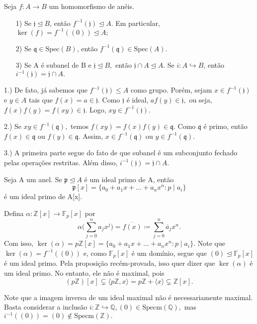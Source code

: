 \documentclass[AlgebraII/algebraII_notes.tex]{subfiles}
\begin{document}
\begin{prop*}
	Seja \(f:A\rightarrow B\) um homomorfismo de anéis.
	\begin{itemize}
		\item[1)] Se \(\mathfrak{j}\trianglelefteq{B}\), então \(f^{-1}(\mathfrak{j})\trianglelefteq{A}.\) Em particular, \(\ker{(f)} = f^{-1}((0))\trianglelefteq{A};\)
		\item[2)] Se \(\mathfrak{q}\in \mathrm{Spec}(B)\), então \(f^{-1}(\mathfrak{q})\in \mathrm{Spec}(A).\)
		\item[3)] Se A é subanel de B e \(\mathfrak{j}\trianglelefteq{B},\) então \(\mathfrak{j}\cap A \trianglelefteq{A}.\) Se \(i:A\hookrightarrow B\),
		      então \(i^{-1}(\mathfrak{j})=\mathfrak{j}\cap A.\)
	\end{itemize}
	\begin{proof*}
		1.) De fato, já sabemos que \(f^{-1}(\mathfrak{j})\leq A\) como grupo. Porém, sejam \(x\in f^{-1}(\mathfrak{j})\)
		e \(y\in A\) tais que \(f(x) = a\in \mathfrak{j}.\) Como \(\mathfrak{j}\) é ideal, \(af(y)\in \mathfrak{j},\)
		ou seja, \(f(x)f(y) = f(xy)\in \mathfrak{j}\). Logo, \(xy\in f^{-1}(\mathfrak{j})\).

		2.) Se \(xy\in f^{-1}(\mathfrak{q}),\) temos \(f(xy) = f(x)f(y)\in \mathfrak{q}.\) Como \(\mathfrak{q}\) é primo,
		então \(f(x)\in \mathfrak{q}\) ou \(f(y)\in \mathfrak{q}.\) Assim, \(x\in f^{-1}(\mathfrak{q})\) ou \(y\in f^{-1}(\mathfrak{q}).\)

		3.) A primeira parte segue do fato de que subanel é um subconjunto fechado pelas operações restritas. Além disso,
		\(i^{-1}(\mathfrak{j}) = \mathfrak{j}\cap A.\) \qedsymbol
	\end{proof*}
\end{prop*}
\begin{example}[Exercício]
	Seja A um anel. Se \(\mathfrak{p}\trianglelefteq A\) é um ideal primo de A, então
	\[
		\mathfrak{p}[x] = \{a_{0} + a_{1}x + \dotsc + a_{n}x^{n}:p\mid a_{i}\}
	\]
	é um ideal primo de A[x].
\end{example}
\begin{example}
	Defina \(\alpha :\mathbb{Z}[x]\rightarrow \mathbb{F}_{p}[x]\) por
	\[
		\alpha \biggl(\sum\limits_{j=0}^{n}a_{j}x^{j}\biggr) = \overline{f(x)}\coloneqq \sum\limits_{j=0}^{n}\overline{a}_{j}x^{n}.
	\]
	Com isso, \(\ker{(\alpha )} = p \mathbb{Z}[x] = \{a_{0} + a_1x + \dotsc +a_{n}x^{n}: p\mid a_{i}\}\). Note que
	\(\ker{(\alpha )} = f^{-1}((0))\) e, como \(\mathbb{F}_{p}[x]\) é um domínio, segue que \((0)\trianglelefteq \mathbb{F}_{p}[x]\) é um ideal primo.
	Pela proposição recém-provada, isso quer dizer que \(\ker{(\alpha )}\) é um ideal primo. No entanto, ele não é maximal, pois
	\[
		(p \mathbb{Z})[x] \subsetneq \langle p \mathbb{Z}, x \rangle = p \mathbb{Z} + \langle x \rangle \subsetneq \mathbb{Z}[x].
	\]
\end{example}
Note que a imagem inversa de um ideal maximal não é necessariamente maximal.
Basta considerar a inclusão \(i:\mathbb{Z}\hookrightarrow \mathbb{Q}, (0)\in \mathrm{Specm}(\mathbb{Q}),\)
mas \(i^{-1}((0)) = (0)\not\in \mathrm{Specm}(\mathbb{Z}).\)
\end{document}
